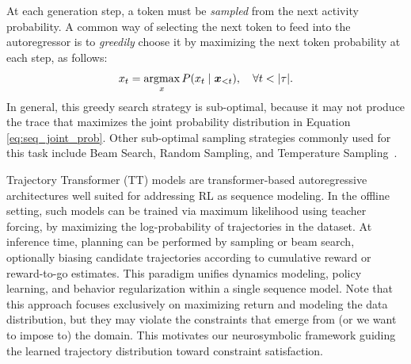 At each generation step, a token must be \textit{sampled} from the next activity probability. A common way of selecting the next token to feed into the autoregressor is to \textit{greedily} choose it by maximizing the next token probability at each step, as follows:
\begin{equation}
{x}_{t} = \operatorname*{argmax}_x P(x_{t} \mid \boldsymbol{x}_{<t}), \quad \forall t < |\tau|.
\end{equation}
\noindent
In general, this greedy search strategy is sub-optimal, because it may not produce the trace that maximizes the joint probability distribution in Equation \ref{eq:seq_joint_prob}. Other sub-optimal sampling strategies commonly used for this task include Beam Search, Random Sampling, and Temperature Sampling~\cite{ramamaneiro24}.

Trajectory Transformer (TT) models are transformer-based autoregressive architectures well suited for addressing RL as sequence modeling. In the offline setting, such models can be trained via maximum likelihood using teacher forcing, by maximizing the log-probability of trajectories in the dataset. At inference time, planning can be performed by sampling or beam search, optionally biasing candidate trajectories according to cumulative reward or reward-to-go estimates. This paradigm unifies dynamics modeling, policy learning, and behavior regularization within a single sequence model.
%
Note that this approach focuses exclusively on maximizing return and modeling the data distribution, but they may violate the constraints that emerge from (or we want to impose to) the domain. This motivates our neurosymbolic framework guiding the learned trajectory distribution toward constraint satisfaction.
